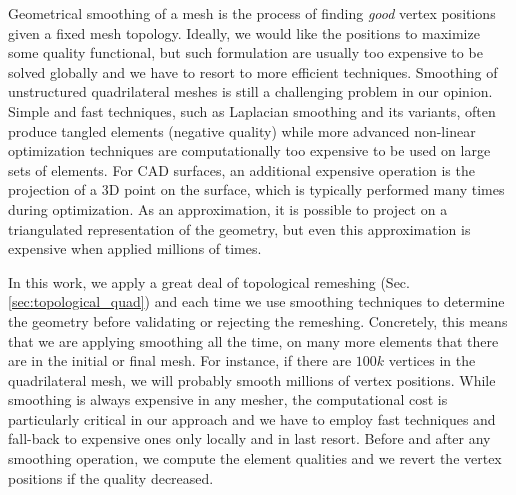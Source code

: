 \documentclass[AMA,STIX1COL]{WileyNJD-v2}
\newcommand\rsec[1]{Sec. \ref{#1}}
\begin{document}
{Geometrical smoothing of a mesh is the process of finding \emph{good} vertex
positions given a fixed mesh topology. Ideally, we would like the positions
to maximize some quality functional, but such formulation are usually
too expensive to be solved globally and we have to resort to more efficient techniques. 
Smoothing of unstructured quadrilateral
meshes is still a challenging problem in our opinion. Simple and fast
techniques, such as Laplacian smoothing and its variants, often produce tangled elements
(negative quality) while more advanced non-linear optimization techniques are
computationally too expensive to be used on large sets of elements.  For CAD
surfaces, an additional expensive operation is the projection of a 3D point on
the surface, which is typically performed many times during optimization. As an
approximation, it is possible to project on a triangulated representation of
the geometry, but even this approximation is expensive when applied millions of
times.

In this work, we apply a great deal of topological remeshing (\rsec{sec:topological_quad})
and each time we use smoothing techniques to determine the geometry before
validating or rejecting the remeshing. Concretely, this means that we are applying
smoothing all the time, on many more elements that there are in the initial or final
mesh. For instance, if there are $100k$ vertices in the quadrilateral mesh, we will
probably smooth millions of vertex positions. While smoothing is always expensive
in any mesher, the computational cost is particularly critical in our approach and
we have to employ fast techniques and fall-back to expensive ones only locally and
in last resort. Before and after any smoothing operation, we compute the element
qualities and we revert the vertex positions if the quality decreased.

}
\end{document}
